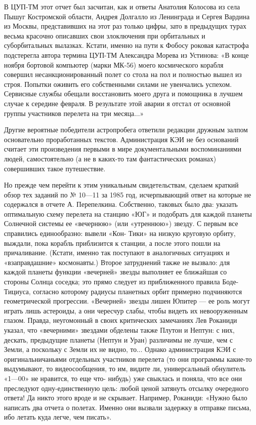 \documentclass[11pt,a4paper,oneside]{article}
\begin{document}
В ЦУП-ТМ этот отчет был засчитан, как и ответы Анатолия Колосова из села Пышуг Костромской области, Андрея Долгалло из Ленинграда и Сергея Вардина из Москвы, представивших на этот раз только цифры, зато в предыдущих турах весьма красочно описавших свои злоключения при орбитальных и суборбитальных вылазках. Кстати, именно на пути к Фобосу роковая катастрофа подстерегла автора термина ЦУП-ТМ Александра Морева из Устинова: «В конце ноября бортовой компьютер (марки МК-56) моего космического корабля совершил несанкционированный полет со стола на пол и полностью вышел из строя. Попытки оживить его собственными силами не увенчались успехом. Сервисные службы обещали восстановить моего друга и помощника в лучшем случае к середине февраля. В результате этой аварии я отстал от основной группы участников перелета на три месяца...»

Другие вероятные победители астропробега ответили редакции дружным залпом основательно проработанных текстов. Администрация КЭИ не без оснований считает эти произведения первыми в мире документальными воспоминаниями людей, самостоятельно (а не в каких-то там фантастических романах) совершивших такое путешествие.

Но прежде чем перейти к этим уникальным свидетельствам, сделаем краткий обзор тех заданий по № 10—11 за 1985 год, исчерпывающий ответ на которые не содержался в отчете А. Перепелкина. Собственно, таковых было два: указать оптимальную схему перелета на станцию «ЮГ» и подобрать для каждой планеты Солнечной системы ее «вечернюю» (или «утреннюю») звезду. С первым все справились единообразно: вывели «Кон- Тики» на низкую круговую орбиту, выждали, пока корабль приблизится к станции, а после этого пошли на причаливание. (Кстати, именно так поступают в аналогичных ситуациях и «взаправдашние» космонавты.) Второе затруднений также не вызвало: для каждой планеты функции «вечерней» звезды выполняет ее ближайшая со стороны Солнца соседка; это прямо следует из приближенного правила Боде-Тициуса, согласно которому радиусы планетных орбит примерно подчиняются геометрической прогрессии. «Вечерней» звезды лишен Юпитер — ее роль могут играть лишь астероиды, а они чересчур слабы, чтобы видеть их невооруженным глазом. Правда, неугомонный в своих критических замечаниях Лев Роканиди указал, что «вечерними» звездами обделены также Плутон и Нептун: с них, дескать, предыдущие планеты (Нептун и Уран) различимы не лучше, чем с Земли, а поскольку с Земли их не видно, то... Однако администрация КЭИ с оригинальничаньями отдельных участников перелета (то они программы какие-то выдумывают, то видеосообщения, то им, видите ли, универсальный обнулитель «1—00» не нравится, то еще что- нибудь) уже свыклась и поняла, что все они преследуют одну-единственную цель: любой ценой затянуть отсылку очередного ответа! Да никто этого вроде и не скрывает. Например, Роканиди: «Нужно было написать два отчета о полетах. Именно они вызвали задержку в отправке письма, ибо летать куда легче, чем писать».
\end{document}
